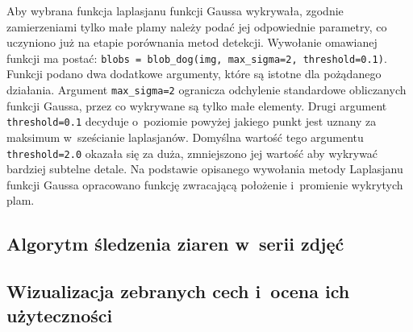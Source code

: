 Aby wybrana funkcja laplasjanu funkcji Gaussa wykrywała, zgodnie
zamierzeniami tylko małe plamy należy podać jej odpowiednie parametry,
co uczyniono już na etapie porównania metod detekcji.
Wywołanie omawianej funkcji ma postać:
\texttt{blobs = blob_dog(img, max_sigma=2, threshold=0.1)}.
Funkcji podano dwa dodatkowe argumenty, które są istotne dla pożądanego
działania.
Argument \texttt{max_sigma=2} ogranicza odchylenie standardowe
obliczanych funkcji Gaussa, przez co wykrywane są tylko małe elementy.
Drugi argument \texttt{threshold=0.1} decyduje o~poziomie
powyżej jakiego punkt jest uznany za maksimum w~sześcianie laplasjanów.
Domyślna wartość tego argumentu \texttt{threshold=2.0} okazała 
się za duża, zmniejszono jej wartość aby wykrywać bardziej subtelne detale.
Na podstawie opisanego wywołania metody Laplasjanu funkcji Gaussa
opracowano funkcję zwracającą położenie i~promienie wykrytych plam.

\subsection{Algorytm śledzenia ziaren w~serii zdjęć}

\subsection{Wizualizacja zebranych cech i~ocena ich użyteczności}
